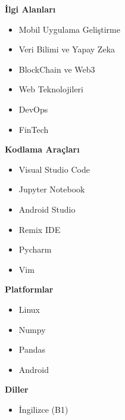 \documentclass[a4paper,11pt]{article}
\begin{document}
\vspace{0.9em}
\noindent
\begin{minipage}[t]{0.48\textwidth}
    \textbf{İlgi Alanları}
    \vspace{0.5em}
    \begin{itemize}[leftmargin=2em]
        \item Mobil Uygulama Geliştirme
        \item Veri Bilimi ve Yapay Zeka
        \item BlockChain ve Web3
		\item Web Teknolojileri
        \item DevOps
        \item FinTech
    \end{itemize}
\end{minipage}%
\hfill
\begin{minipage}[t]{0.48\textwidth}
    \textbf{Kodlama Araçları}
    \vspace{0.5em}
    \begin{itemize}[leftmargin=2em]
        \item Visual Studio Code
        \item Jupyter Notebook
        \item Android Studio
        \item Remix IDE
        \item Pycharm
        \item Vim
    \end{itemize}
\end{minipage}


\vspace{0.9em}
\noindent
\begin{minipage}[t]{0.48\textwidth}
    \textbf{Platformlar}
    \vspace{0.5em}
    \begin{itemize}[leftmargin=2em]
        \item Linux
        \item Numpy
        \item Pandas
        \item Android
    \end{itemize}
\end{minipage}%
\hfill
\begin{minipage}[t]{0.48\textwidth}
    \textbf{Diller}
    \vspace{0.5em}
    \begin{itemize}[leftmargin=2em]
        \item İngilizce (B1)
    \end{itemize}
\end{minipage}
\end{document}
